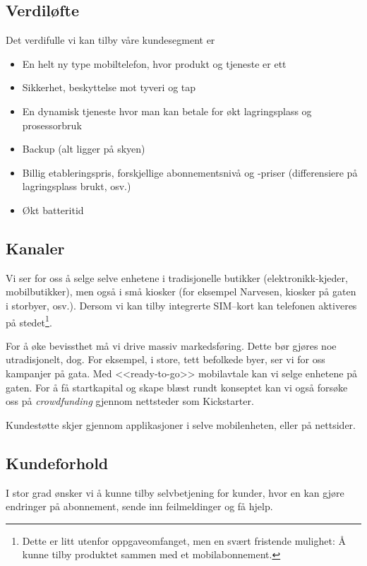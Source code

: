 \subsection{Verdiløfte}

Det verdifulle vi kan tilby våre kundesegment er

\begin{itemize}
  \item En helt ny type mobiltelefon, hvor produkt og tjeneste er ett
  \item Sikkerhet, beskyttelse mot tyveri og tap
  \item En dynamisk tjeneste hvor man kan betale for økt lagringsplass og
    prosessorbruk
  \item Backup (alt ligger på skyen)
  \item Billig etableringspris, forskjellige abonnementsnivå og
    -priser (differensiere på lagringsplass brukt, osv.)
  \item Økt batteritid
\end{itemize}

\subsection{Kanaler}

Vi ser for oss å selge selve enhetene i tradisjonelle butikker
(elektronikk-kjeder, mobilbutikker), men også i små kiosker (for eksempel
Narvesen, kiosker på gaten i storbyer, osv.). Dersom vi kan tilby integrerte
SIM--kort kan telefonen aktiveres på stedet\footnote{Dette er litt utenfor
oppgaveomfanget, men en svært fristende mulighet: Å kunne tilby produktet
sammen med et mobilabonnement.}.

For å øke bevissthet må vi drive massiv markedsføring. Dette bør gjøres noe
utradisjonelt, dog. For eksempel, i store, tett befolkede byer, ser vi for oss
kampanjer på gata. Med <<ready-to-go>> mobilavtale kan vi selge enhetene på
gaten. For å få startkapital og skape blæst rundt konseptet kan vi også forsøke
oss på \textit{crowdfunding} gjennom nettsteder som Kickstarter.

Kundestøtte skjer gjennom applikasjoner i selve mobilenheten, eller på nettsider.

\subsection{Kundeforhold}

I stor grad ønsker vi å kunne tilby selvbetjening for kunder, hvor en kan gjøre
endringer på abonnement, sende inn feilmeldinger og få hjelp.

